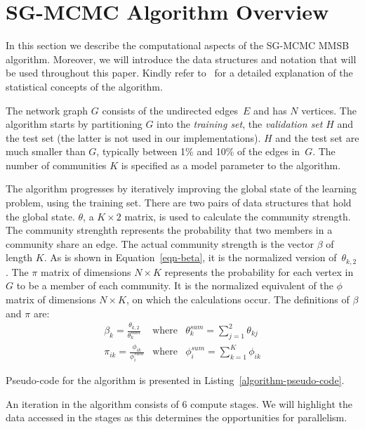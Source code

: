 \section{SG-MCMC Algorithm Overview} 
\label{sec-algorithm}

In this section we describe the computational aspects of the SG-MCMC MMSB
algorithm. Moreover, we will introduce the data structures and notation that
will be used throughout this paper.
%
Kindly refer to~\cite{DBLP:journals/corr/LiAW15} for a detailed explanation of
the statistical concepts of the algorithm.

The network graph $G$ consists of the undirected edges~$E$ and has $N$ vertices.
The algorithm starts by partitioning $G$ into the \textit{training
set}, the \textit{validation set} $H$ and the test set (the latter is not used
in our implementations). $H$ and the test set
are much smaller than $G$, typically between 1\% and 10\% of the edges
in~$G$.
The number of communities $K$
is specified as a model parameter to the algorithm.

The algorithm progresses by iteratively improving the global state of the learning
problem, using the training set. There are two pairs of data structures that
hold the global state. $\theta$, a $K{\times}2$ matrix, is used to
calculate
the community strength. The community strenghth represents the probability that two members in a community share
an edge. The actual community strength
is the vector $\beta$ of length $K$. As is shown in Equation~\ref{eqn-beta}, it is the
normalized version of~$\theta_{k,2}$.
The $\pi$ matrix of dimensions $N{\times}K$ represents the probability for
each vertex in $G$ to be a member of each community. It is the normalized
equivalent of the $\phi$ matrix of dimensions $N{\times}K$, on which the
calculations occur. The
definitions of $\beta$ and $\pi$ are:
%
\begin{eqnarray}
    \label{eqn-beta}
    \beta_{k} = \frac {\theta_{k,2}} {\theta^{sum}_k} &
    	\textrm{where} & \theta^{sum}_k = \sum_{j=1}^{2} \theta_{kj} \\
    \label{eqn-pi}
    \pi_{ik} = \frac {\phi_{ik}} {\phi^{sum}_i} &
    	\textrm{where} & \phi^{sum}_i = \sum_{k=1}^{K} \phi_{ik}
\end{eqnarray}

Pseudo-code for the algorithm is presented in
Listing~\ref{algorithm-pseudo-code}.

An iteration in the algorithm consists of 6 compute stages.
We will highlight the data accessed in the stages as this
determines the opportunities for parallelism.

